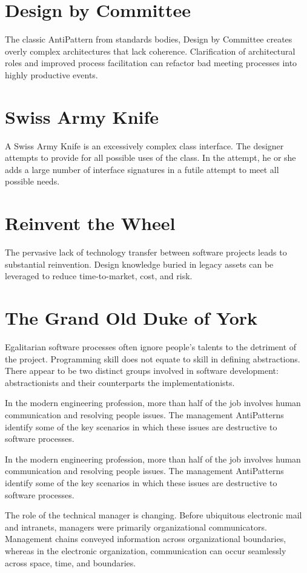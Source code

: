 \documentclass{book}
\newcounter{subpart}
\begin{document}
\chapter{Design by Committee}
The classic AntiPattern from standards bodies, Design by Committee creates overly complex architectures that lack coherence.
Clarification of architectural roles and improved process facilitation can refactor bad meeting processes into highly productive events.
\chapter{Swiss Army Knife}
A Swiss Army Knife is an excessively complex class interface. The designer attempts to provide for all possible uses of the class.
In the attempt, he or she adds a large number of interface signatures in a futile attempt to meet all possible needs.
\chapter{Reinvent the Wheel}
The pervasive lack of technology transfer between software projects leads to substantial reinvention.
Design knowledge buried in legacy assets can be leveraged to reduce time-to-market, cost, and risk.
\chapter{The Grand Old Duke of York}
Egalitarian software processes often ignore people’s talents to the detriment of the project.
Programming skill does not equate to skill in defining abstractions.
There appear to be two distinct groups involved in software development: abstractionists and their counterparts the implementationists.


In the modern engineering profession, more than half of the job involves human communication and resolving people issues.
The management AntiPatterns identify some of the key scenarios in which these issues are destructive to software processes.

In the modern engineering profession, more than half of the job involves human communication and resolving people issues.
The management AntiPatterns identify some of the key scenarios in which these issues are destructive to software processes.

The role of the technical manager is changing. Before ubiquitous electronic mail and intranets, managers were primarily organizational communicators.
Management chains conveyed information across organizational boundaries, whereas in the electronic organization, communication can occur seamlessly across space, time, and boundaries.
\end{document}
